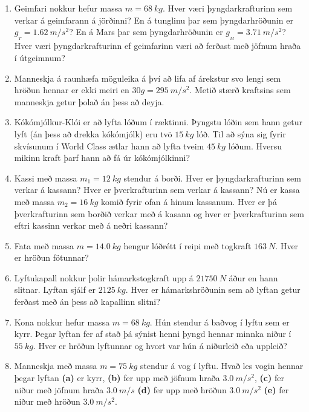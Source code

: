 \begin{enumerate}[label = \textbf{Dæmi \thechapter.\arabic*.}]

\item Geimfari nokkur hefur massa $m = \SI{68}{kg}$. Hver væri þyngdarkrafturinn sem verkar á geimfarann á jörðinni? En á tunglinu þar sem þyngdarhröðunin er $g_{_T} = \SI{1.62}{m/s^2}$? En á Mars þar sem þyngdarhröðunin er $g_{_{M}} = \SI{3.71}{m/s^2}$? Hver væri þyngdarkrafturinn ef geimfarinn væri að ferðast með jöfnum hraða í útgeimnum?

\item Manneskja á raunhæfa möguleika á því að lifa af árekstur svo lengi sem hröðun hennar er ekki meiri en $30g = \SI{295}{m/s^2}$. Metið stærð kraftsins sem manneskja getur þolað án þess að deyja.

\item Kókómjólkur-Klói er að lyfta lóðum í ræktinni. Þyngstu lóðin sem hann getur lyft (án þess að drekka kókómjólk) eru tvö $\SI{15}{kg}$ lóð. Til að sýna sig fyrir skvísunum í World Class ætlar hann að lyfta tveim $\SI{45}{kg}$ lóðum. Hversu mikinn kraft þarf hann að fá úr kókómjólkinni?



\item Kassi með massa $m_1 = \SI{12}{kg}$ stendur á borði. Hver er þyngdarkrafturinn sem verkar á kassann? Hver er þverkrafturinn sem verkar á kassann? Nú er kassa með massa $m_2 = \SI{16}{kg}$ komið fyrir ofan á hinum kassanum. Hver er þá þverkrafturinn sem borðið verkar með á kasann og hver er þverkrafturinn sem eftri kassinn verkar með á neðri kassann?

\item Fata með massa $m = \SI{14.0}{kg}$ hengur lóðrétt í reipi með togkraft $\SI{163}{N}$. Hver er hröðun fötunnar?

\item Lyftukapall nokkur þolir hámarkstogkraft upp á $\SI{21750}{N}$ áður en hann slitnar. Lyftan sjálf er $\SI{2125}{kg}$. Hver er hámarkshröðunin sem að lyftan getur ferðast með án þess að kapallinn slitni?

\item Kona nokkur hefur massa $m = \SI{68}{kg}$. Hún stendur á baðvog í lyftu sem er kyrr. Þegar lyftan fer af stað þá sýnist henni þyngd hennar minnka niður í $\SI{55}{kg}$. Hver er hröðun lyftunnar og hvort var hún á niðurleið eða uppleið?

\item Manneskja með massa $m = \SI{75}{kg}$ stendur á vog í lyftu. Hvað les vogin hennar þegar lyftan \textbf{(a)} er kyrr, \textbf{(b)} fer upp með jöfnum hraða $\SI{3.0}{m/s^2}$, \textbf{(c)} fer niður með jöfnum hraða $\SI{3.0}{m/s}$ \textbf{(d)} fer upp með hröðun $\SI{3.0}{m/s^2}$ \textbf{(e)}  fer niður með hröðun $\SI{3.0}{m/s^2}$.


\end{enumerate}
